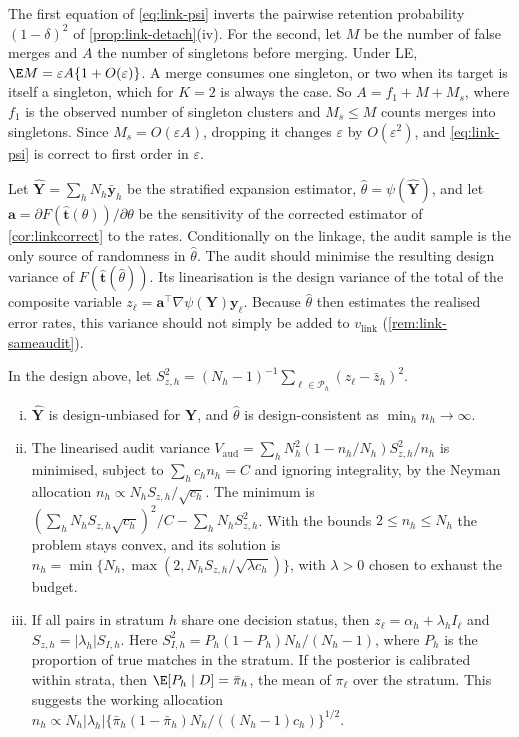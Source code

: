 The first equation of \eqref{eq:link-psi} inverts the pairwise retention probability $(1-\delta)^2$ of \cref{prop:link-detach}(iv). For the second, let $M$ be the number of false merges and $A$ the number of singletons before merging. Under LE, $\E M=\varepsilon A\{1+O(\varepsilon)\}$. A merge consumes one singleton, or two when its target is itself a singleton, which for $K=2$ is always the case. So $A=f_1+M+M_s$, where $f_1$ is the observed number of singleton clusters and $M_s\le M$ counts merges into singletons. Since $M_s=O(\varepsilon A)$, dropping it changes $\varepsilon$ by $O(\varepsilon^2)$, and \eqref{eq:link-psi} is correct to first order in $\varepsilon$.

Let $\hat{\bm Y}=\sum_hN_h\bar{\bm y}_h$ be the stratified expansion estimator, $\hat\theta=\psi(\hat{\bm Y})$, and let $\bm a=\partial F(\hat{\bm t}(\theta))/\partial\theta$ be the sensitivity of the corrected estimator of \cref{cor:linkcorrect} to the rates. Conditionally on the linkage, the audit sample is the only source of randomness in $\hat\theta$. The audit should minimise the resulting design variance of $F(\hat{\bm t}(\hat\theta))$. Its linearisation is the design variance of the total of the composite variable $z_\ell=\bm a^{\top}\nabla\psi(\bm Y)\bm y_\ell$. Because $\hat\theta$ then estimates the realised error rates, this variance should not simply be added to $v_{\mathrm{link}}$ (\cref{rem:link-sameaudit}).

\begin{proposition}\label{prop:link-audit}
In the design above, let $S_{z,h}^2=(N_h-1)^{-1}\sum_{\ell\in\mathcal P_h}(z_\ell-\bar z_h)^2$.
\begin{enumerate}[(i)]
  \item $\hat{\bm Y}$ is design-unbiased for $\bm Y$, and $\hat\theta$ is design-consistent as $\min_hn_h\to\infty$.
  \item The linearised audit variance $V_{\mathrm{aud}}=\sum_hN_h^2(1-n_h/N_h)S_{z,h}^2/n_h$ is minimised, subject to $\sum_hc_hn_h=C$ and ignoring integrality, by the Neyman allocation $n_h\propto N_hS_{z,h}/\sqrt{c_h}$. The minimum is $(\sum_hN_hS_{z,h}\sqrt{c_h})^2/C-\sum_hN_hS_{z,h}^2$. With the bounds $2\le n_h\le N_h$ the problem stays convex, and its solution is $n_h=\min\{N_h,\max(2,N_hS_{z,h}/\sqrt{\lambda c_h})\}$, with $\lambda>0$ chosen to exhaust the budget.
  \item If all pairs in stratum $h$ share one decision status, then $z_\ell=\alpha_h+\lambda_hI_\ell$ and $S_{z,h}=|\lambda_h|S_{I,h}$. Here $S_{I,h}^2=P_h(1-P_h)N_h/(N_h-1)$, where $P_h$ is the proportion of true matches in the stratum. If the posterior is calibrated within strata, then $\E[P_h\mid D]=\bar\pi_h$, the mean of $\pi_\ell$ over the stratum. This suggests the working allocation $n_h\propto N_h|\lambda_h|\{\bar\pi_h(1-\bar\pi_h)N_h/((N_h-1)c_h)\}^{1/2}$.
\end{enumerate}
\end{proposition}

